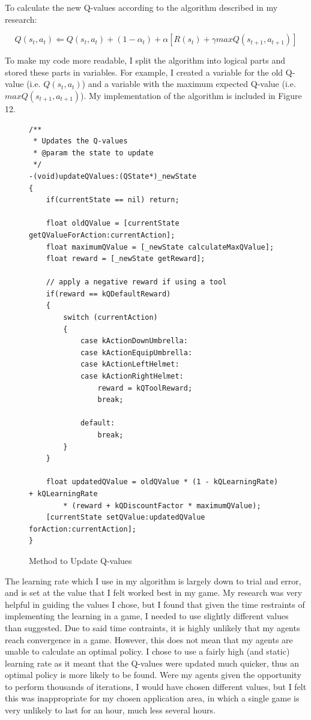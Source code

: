 \documentclass[a4paper,oneside]{report}
\begin{document}
To calculate the new Q-values according to the algorithm described in my research:

\begin{equation*}
	Q(s_t,a_t) \Leftarrow Q(s_t, a_t) + (1 -\alpha_t) + \alpha[R(s_t) + \gamma max Q(s_{t+1}, a_{t+1})]
\end{equation*}

To make my code more readable, I split the algorithm into logical parts and stored these parts in variables. For example, I created a variable for the old Q-value (i.e. $Q(s_t, a_t)$) and a variable with the maximum expected Q-value (i.e. $max Q(s_{t+1}, a_{t+1})$). My implementation of the algorithm is included in Figure 12.

\begin{figure}[h!]
\begin{lstlisting}
/**
 * Updates the Q-values
 * @param the state to update
 */
-(void)updateQValues:(QState*)_newState
{    
    if(currentState == nil) return;
            
    float oldQValue = [currentState getQValueForAction:currentAction];
    float maximumQValue = [_newState calculateMaxQValue];
    float reward = [_newState getReward];
    
    // apply a negative reward if using a tool
    if(reward == kQDefaultReward) 
    {
        switch (currentAction)
        {
            case kActionDownUmbrella:
            case kActionEquipUmbrella:
            case kActionLeftHelmet:
            case kActionRightHelmet:
                reward = kQToolReward;
                break;
                
            default:
                break;
        } 
    }
        
    float updatedQValue = oldQValue * (1 - kQLearningRate) + kQLearningRate 
    	* (reward + kQDiscountFactor * maximumQValue);
    [currentState setQValue:updatedQValue forAction:currentAction];
}
\end{lstlisting}
\caption{Method to Update Q-values}
\end{figure}

The learning rate which I use in my algorithm is largely down to trial and error, and is set at the value that I felt worked best in my game. My research was very helpful in guiding the values I chose, but I found that given the time restraints of implementing the learning in a game, I needed to use slightly different values than suggested. Due to said time contraints, it is highly unlikely that my agents reach convergence in a game. However, this does not mean that my agents are unable to calculate an optimal policy. I chose to use a fairly high (and static) learning rate as it meant that the Q-values were updated much quicker, thus an optimal policy is more likely to be found. Were my agents given the opportunity to perform thousands of iterations, I would have chosen different values, but I felt this was inappropriate for my chosen application area, in which a single game is very unlikely to last for an hour, much less several hours.
\end{document}
